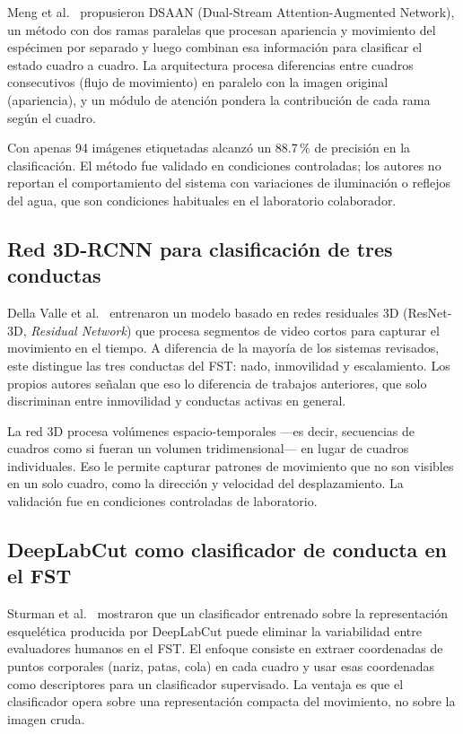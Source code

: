 Meng et al.\ \cite{meng2024_dsaan} propusieron DSAAN (Dual-Stream Attention-Augmented
Network), un método con dos ramas paralelas que procesan apariencia y movimiento del
espécimen por separado y luego combinan esa información para clasificar el estado
cuadro a cuadro. La arquitectura procesa diferencias entre cuadros consecutivos (flujo de
movimiento) en paralelo con la imagen original (apariencia), y un módulo de atención
pondera la contribución de cada rama según el cuadro.

Con apenas 94 imágenes etiquetadas alcanzó un 88.7\,\% de precisión en la clasificación.
El método fue validado en condiciones controladas; los autores no reportan el
comportamiento del sistema con variaciones de iluminación o reflejos del agua, que son
condiciones habituales en el laboratorio colaborador.

\subsection{Red 3D-RCNN para clasificación de tres conductas}

Della Valle et al.\ \cite{della_valle2025} entrenaron un modelo basado en redes
residuales 3D (ResNet-3D, \textit{Residual Network}) que procesa segmentos de video cortos para capturar el
movimiento en el tiempo. A diferencia de la mayoría de los sistemas revisados, este
distingue las tres conductas del FST: nado, inmovilidad y escalamiento. Los propios
autores señalan que eso lo diferencia de trabajos anteriores, que solo discriminan entre
inmovilidad y conductas activas en general.

La red 3D procesa volúmenes espacio-temporales ---es decir, secuencias de cuadros como
si fueran un volumen tridimensional--- en lugar de cuadros individuales. Eso le permite
capturar patrones de movimiento que no son visibles en un solo cuadro, como la dirección
y velocidad del desplazamiento. La validación fue en condiciones controladas de
laboratorio.

\subsection{DeepLabCut como clasificador de conducta en el FST}

Sturman et al.\ \cite{sturman2020_dlc} mostraron que un clasificador entrenado sobre
la representación esquelética producida por DeepLabCut \cite{mathis2018_dlc} puede eliminar la variabilidad
entre evaluadores humanos en el FST. El enfoque consiste en extraer coordenadas de
puntos corporales (nariz, patas, cola) en cada cuadro y usar esas coordenadas como
descriptores para un clasificador supervisado. La ventaja es que el clasificador opera
sobre una representación compacta del movimiento, no sobre la imagen cruda.

